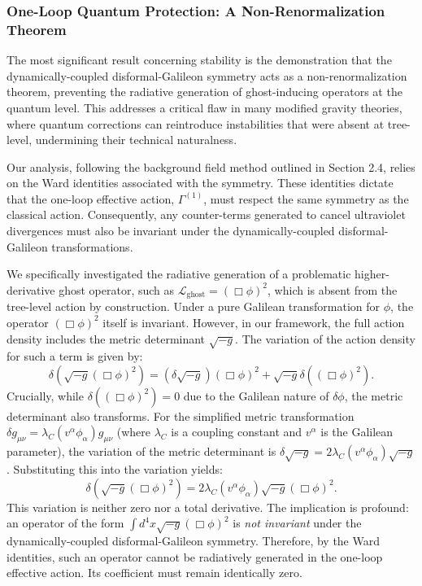 \documentclass[twocolumn]{aastex631}
\begin{document}
\subsubsection{One-Loop Quantum Protection: A Non-Renormalization Theorem}
The most significant result concerning stability is the demonstration that the dynamically-coupled disformal-Galileon symmetry acts as a non-renormalization theorem, preventing the radiative generation of ghost-inducing operators at the quantum level. This addresses a critical flaw in many modified gravity theories, where quantum corrections can reintroduce instabilities that were absent at tree-level, undermining their technical naturalness.

Our analysis, following the background field method outlined in Section 2.4, relies on the Ward identities associated with the symmetry. These identities dictate that the one-loop effective action, $\Gamma^{(1)}$, must respect the same symmetry as the classical action. Consequently, any counter-terms generated to cancel ultraviolet divergences must also be invariant under the dynamically-coupled disformal-Galileon transformations.

We specifically investigated the radiative generation of a problematic higher-derivative ghost operator, such as $\mathcal{L}_{\text{ghost}} = (\Box \phi)^2$, which is absent from the tree-level action by construction. Under a pure Galilean transformation for $\phi$, the operator $(\Box \phi)^2$ itself is invariant. However, in our framework, the full action density includes the metric determinant $\sqrt{-g}$. The variation of the action density for such a term is given by:
\begin{equation}
\delta \left( \sqrt{-g} (\Box \phi)^2 \right) = \left( \delta \sqrt{-g} \right) (\Box \phi)^2 + \sqrt{-g} \delta \left( (\Box \phi)^2 \right).
\end{equation}
Crucially, while $\delta \left( (\Box \phi)^2 \right) = 0$ due to the Galilean nature of $\delta \phi$, the metric determinant also transforms. For the simplified metric transformation $\delta g_{\mu\nu} = \lambda_C (v^\alpha \phi_\alpha) g_{\mu\nu}$ (where $\lambda_C$ is a coupling constant and $v^\alpha$ is the Galilean parameter), the variation of the metric determinant is $\delta \sqrt{-g} = 2 \lambda_C (v^\alpha \phi_\alpha) \sqrt{-g}$. Substituting this into the variation yields:
\begin{equation}
\delta \left( \sqrt{-g} (\Box \phi)^2 \right) = 2 \lambda_C (v^\alpha \phi_\alpha) \sqrt{-g} (\Box \phi)^2.
\end{equation}
This variation is neither zero nor a total derivative. The implication is profound: an operator of the form $\int d^4x \sqrt{-g} (\Box \phi)^2$ is \textit{not invariant} under the dynamically-coupled disformal-Galileon symmetry. Therefore, by the Ward identities, such an operator cannot be radiatively generated in the one-loop effective action. Its coefficient must remain identically zero.
\end{document}
